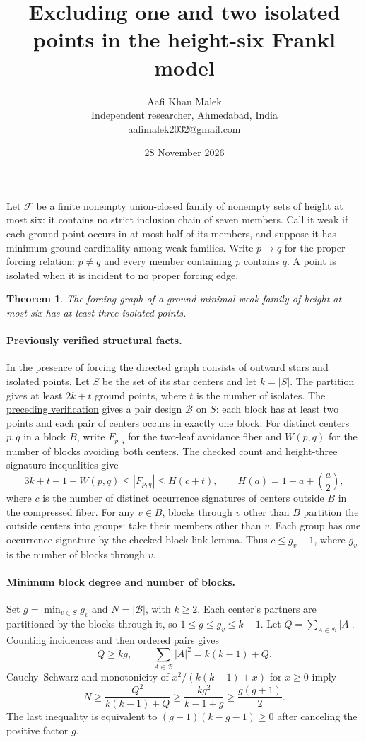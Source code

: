 \documentclass[11pt,letterpaper]{article}
\title{Excluding one and two isolated points in the height-six Frankl model}
\author{Aafi Khan Malek\\ \small Independent researcher, Ahmedabad, India\\
\small\href{mailto:aafimalek2032@gmail.com}{aafimalek2032@gmail.com}}
\date{28 November 2026}
\newtheorem{theorem}{Theorem}
\begin{document}
\maketitle

Let \(\mathcal F\) be a finite nonempty union-closed family of nonempty
sets of height at most six: it contains no strict inclusion chain of seven
members. Call it weak if each ground point occurs in at most half
of its members, and suppose it has minimum ground cardinality among
weak families. Write \(p\to q\) for the proper forcing relation:
\(p\ne q\) and every member containing \(p\) contains \(q\). A point is
isolated when it is incident to no proper forcing edge.

\begin{theorem}
The forcing graph of a ground-minimal weak family of height at most six
has at least three isolated points.
\end{theorem}

\paragraph{Previously verified structural facts.}
In the presence of forcing the directed graph consists of outward stars
and isolated points. Let \(S\) be the set of its star centers and let
\(k=|S|\). The partition gives at least \(2k+t\) ground points,
where \(t\) is the number of isolates. The
\href{https://github.com/Aafimalek/novel-discoveries/tree/043d266655932e3badfe48220085216e90065dd6/frankl-height-six}
{preceding verification} gives a pair design \(\mathcal B\) on \(S\):
each block has at least two points and each pair of centers occurs
in exactly one block. For distinct centers \(p,q\) in a block \(B\),
write \(F_{p,q}\) for the two-leaf avoidance fiber and \(W(p,q)\)
for the number of blocks avoiding both centers. The checked
count and height-three signature inequalities give
\[
  3k+t-1+W(p,q)\le |F_{p,q}|\le H(c+t),
  \qquad H(a)=1+a+\binom a2,
\]
where \(c\) is the number of distinct occurrence signatures of
centers outside \(B\) in the compressed fiber. For any \(v\in B\),
blocks through \(v\) other than \(B\) partition the outside centers into
groups: take their members other than \(v\). Each group has one
occurrence signature by the checked block-link lemma. Thus
\(c\le g_v-1\), where \(g_v\) is the number of blocks through \(v\).

\paragraph{Minimum block degree and number of blocks.}
Set \(g=\min_{v\in S}g_v\) and \(N=|\mathcal B|\), with \(k\ge2\).
Each center's partners are partitioned by the blocks through it,
so \(1\le g\le g_v\le k-1\). Let \(Q=\sum_{A\in\mathcal B}|A|\).
Counting incidences and then ordered pairs gives
\[
 Q\ge kg,\qquad
 \sum_{A\in\mathcal B}|A|^2=k(k-1)+Q.
\]
Cauchy--Schwarz and monotonicity of \(x^2/(k(k-1)+x)\) for
\(x\ge0\) imply
\[
 N\ge\frac{Q^2}{k(k-1)+Q}\ge\frac{kg^2}{k-1+g}
   \ge\frac{g(g+1)}2.
\]
The last inequality is equivalent to \((g-1)(k-g-1)\ge0\)
after canceling the positive factor \(g\).
\end{document}

